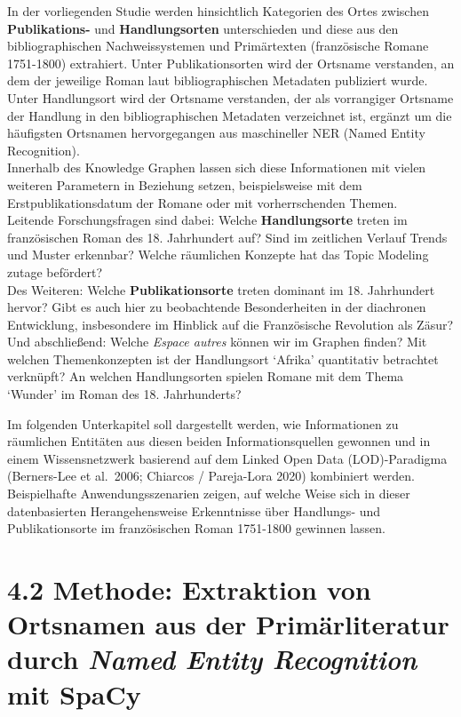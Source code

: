 \documentclass[
  12pt,
  letterpaper,
  DIV=11,
  numbers=noendperiod]{scrreprt}
\begin{document}
In der vorliegenden Studie werden hinsichtlich Kategorien des Ortes
zwischen \textbf{Publikations-} und \textbf{Handlungsorten}
unterschieden und diese aus den bibliographischen Nachweissystemen und
Primärtexten (französische Romane 1751-1800) extrahiert. Unter
Publikationsorten wird der Ortsname verstanden, an dem der jeweilige
Roman laut bibliographischen Metadaten publiziert wurde. Unter
Handlungsort wird der Ortsname verstanden, der als vorrangiger Ortsname
der Handlung in den bibliographischen Metadaten verzeichnet ist, ergänzt
um die häufigsten Ortsnamen hervorgegangen aus maschineller NER (Named
Entity Recognition).\\
Innerhalb des Knowledge Graphen lassen sich diese Informationen mit
vielen weiteren Parametern in Beziehung setzen, beispielsweise mit dem
Erstpublikationsdatum der Romane oder mit vorherrschenden Themen.\\
Leitende Forschungsfragen sind dabei: Welche \textbf{Handlungsorte}
treten im französischen Roman des 18. Jahrhundert auf? Sind im
zeitlichen Verlauf Trends und Muster erkennbar? Welche räumlichen
Konzepte hat das Topic Modeling zutage befördert?\\
Des Weiteren: Welche \textbf{Publikationsorte} treten dominant im 18.
Jahrhundert hervor? Gibt es auch hier zu beobachtende Besonderheiten in
der diachronen Entwicklung, insbesondere im Hinblick auf die
Französische Revolution als Zäsur?\\
Und abschließend: Welche \emph{Espace autres} können wir im Graphen
finden? Mit welchen Themenkonzepten ist der Handlungsort `Afrika'
quantitativ betrachtet verknüpft? An welchen Handlungsorten spielen
Romane mit dem Thema `Wunder' im Roman des 18. Jahrhunderts?

Im folgenden Unterkapitel soll dargestellt werden, wie Informationen zu
räumlichen Entitäten aus diesen beiden Informationsquellen gewonnen und
in einem Wissensnetzwerk basierend auf dem Linked Open Data
(LOD)-Paradigma (Berners-Lee et al.~2006; Chiarcos / Pareja-Lora 2020)
kombiniert werden. Beispielhafte Anwendungsszenarien zeigen, auf welche
Weise sich in dieser datenbasierten Herangehensweise Erkenntnisse über
Handlungs- und Publikationsorte im französischen Roman 1751-1800
gewinnen lassen.

\section{\texorpdfstring{4.2 Methode: Extraktion von Ortsnamen aus der
Primärliteratur durch \emph{Named Entity Recognition} mit
SpaCy}{4.2 Methode: Extraktion von Ortsnamen aus der Primärliteratur durch Named Entity Recognition mit SpaCy}}\label{methode-extraktion-von-ortsnamen-aus-der-primuxe4rliteratur-durch-named-entity-recognition-mit-spacy}
\end{document}
